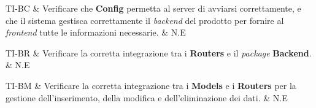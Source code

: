 TI-BC  & Verificare che \textbf{Config} permetta al server di avviarsi correttamente, e che 
	 il sistema gestisca correttamente il \textit{backend} del prodotto per fornire al \textit{frontend}
	 tutte le informazioni necessarie. & N.E \tabularnewline \hline

TI-BR  & Verificare la corretta integrazione tra i \textbf{Routers} e il \textit{package} \textbf{Backend}. & N.E \tabularnewline \hline

TI-BM  & Verificare la corretta integrazione tra i \textbf{Models} e i \textbf{Routers} per la gestione dell'inserimento, della
	 modifica e dell'eliminazione dei dati. & N.E \tabularline \hline





